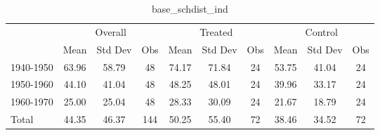 \begin{table}[htbp]\centering
\def\sym#1{\ifmmode^{#1}\else\(^{#1}\)\fi}
\caption{base\_schdist\_ind \label{tab1}}
\begin{tabular}{l*{3}{ccc}}
\toprule
                    &\multicolumn{3}{c}{Overall}           &\multicolumn{3}{c}{Treated}           &\multicolumn{3}{c}{Control}           \\
                    &        Mean&     Std Dev&         Obs&        Mean&     Std Dev&         Obs&        Mean&     Std Dev&         Obs\\
\midrule
1940-1950           &       63.96&       58.79&          48&       74.17&       71.84&          24&       53.75&       41.04&          24\\
1950-1960           &       44.10&       41.04&          48&       48.25&       48.01&          24&       39.96&       33.17&          24\\
1960-1970           &       25.00&       25.04&          48&       28.33&       30.09&          24&       21.67&       18.79&          24\\
Total               &       44.35&       46.37&         144&       50.25&       55.40&          72&       38.46&       34.52&          72\\
\bottomrule
\end{tabular}
\end{table}

